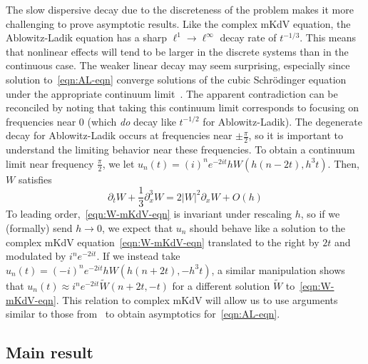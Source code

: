 \documentclass[letterpaper, reqno,final]{amsart}
\newcommand{\fhPi}{\frac{\pi}{2}}
\begin{document}
The slow dispersive decay due to the discreteness of the problem makes it more challenging to prove asymptotic results.  Like the complex mKdV equation, the Ablowitz-Ladik equation has a sharp $\ell^1 \to \ell^\infty$ decay rate of $t^{-1/3}$\cite{stefanovAsymptoticBehaviourSmall2005}.  This means that nonlinear effects will tend to be larger in the discrete systems than in the continuous case.  The weaker linear decay may seem surprising, especially since solution to~\eqref{eqn:AL-eqn} converge solutions of the cubic Schr\"odinger equation under the appropriate continuum limit~\cite{killipContinuumLimitAblowitz2022a}.  The apparent contradiction can be reconciled by noting that taking this continuum limit corresponds to focusing on frequencies near $0$ (which \emph{do} decay like $t^{-1/2}$ for Ablowitz-Ladik).  The degenerate decay for Ablowitz-Ladik occurs at frequencies near $\pm \frac{\pi}{2}$, so it is important to understand the limiting behavior near these frequencies.  To obtain a continuum limit near frequency $\fhPi$, we let $u_n(t) = (i)^n e^{-2it} h W(h(n-2t), h^3t)$.  Then, $W$ satisfies
\begin{equation}\label{eqn:W-mKdV-eqn}
    \partial_t W + \frac{1}{3}\partial_x^3 W = 2 |W|^2 \partial_x W + O(h)
\end{equation}
To leading order,~\eqref{eqn:W-mKdV-eqn} is invariant under rescaling $h$, so if we (formally) send $h \to 0$, we expect that $u_n$ should behave like a solution to the complex mKdV equation~\eqref{eqn:W-mKdV-eqn} translated to the right by $2t$ and modulated by $i^ne^{-2it}$.  If we instead take $u_n(t) = (-i)^n e^{-2it} h W(h(n+2t), -h^3t)$, a similar manipulation shows that
$ u_n(t) \approx i^{n}e^{-2it} \tilde{W}(n + 2t,-t)$
for a different solution $\tilde{W}$ to~\eqref{eqn:W-mKdV-eqn}.  This relation to complex mKdV will allow us to use arguments similar to those from~\cite{stewartLongTimeDecay2021} to obtain asymptotics for~\eqref{eqn:AL-eqn}.
			
\subsection{Main result}			
		
\end{document}
